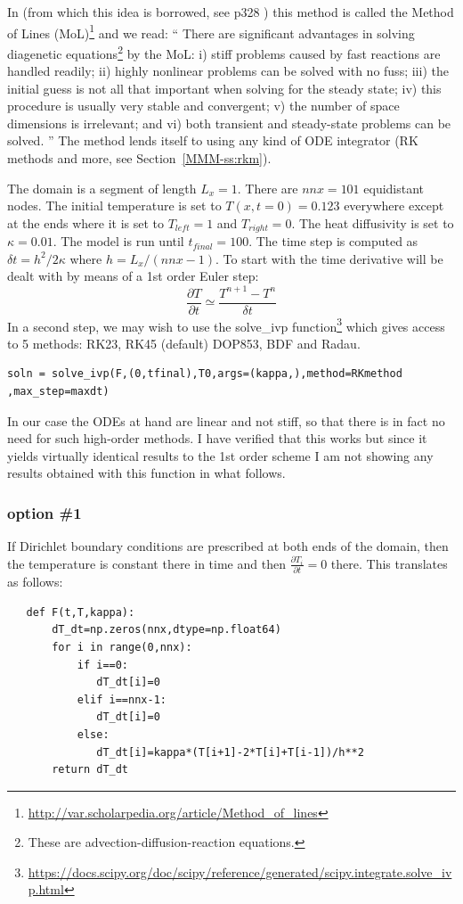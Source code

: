 In \textcite{boudreau} (from which this idea is borrowed, see p328 )
this method is called the Method of Lines (MoL)\footnote{\url{http://var.scholarpedia.org/article/Method_of_lines}} and we read:
``
There are significant advantages in solving diagenetic equations\footnote{These
are advection-diffusion-reaction equations.} by the MoL: 
i) stiff problems caused by fast reactions are handled readily; 
ii) highly nonlinear problems can be solved with no fuss; 
iii) the initial guess is not all that important when solving for the steady state; 
iv) this procedure is usually very stable and convergent; 
v) the number of space dimensions is irrelevant; and 
vi) both transient and steady-state problems can be solved.
''
The method lends itself to using any kind of ODE integrator (RK methods and more, 
see Section~\ref{MMM-ss:rkm}).

The domain is a segment of length $L_x=1$. There are $nnx=101$ equidistant nodes. 
The initial temperature is set to $T(x,t=0)=0.123$ everywhere 
except at the ends where it is set to $T_{left}=1$ and $T_{right}=0$.
The heat diffusivity is set to $\kappa=0.01$. The model is run until $t_{final}=100$.
The time step is computed as $\delta t=h^2/2\kappa$ where $h=L_x/(nnx-1)$.
To start with the time derivative will be dealt with by means of a 1st order
Euler step:
\[
\frac{\partial T}{\partial t} \simeq \frac{T^{n+1}-T^n}{\delta t}
\]
In a second step, we may wish to use the {\python solve\_ivp} 
function\footnote{\url{https://docs.scipy.org/doc/scipy/reference/generated/scipy.integrate.solve_ivp.html}}
which gives access to 5 methods: RK23, RK45 (default) DOP853, BDF and Radau.

\begin{lstlisting}
soln = solve_ivp(F,(0,tfinal),T0,args=(kappa,),method=RKmethod ,max_step=maxdt)
\end{lstlisting}

In our case the ODEs at hand are linear and not stiff, so that 
there is in fact no need for such high-order methods.
I have verified that this works but since it yields virtually identical 
results to the 1st order scheme I am not showing any results obtained with this function in what follows.

\subsubsection*{option \#1}

If Dirichlet boundary conditions are prescribed at both ends of the domain, 
then the temperature is constant there in time and then $\frac{\partial T_i}{\partial t}=0$ there.
This translates as follows:
\begin{lstlisting}
   def F(t,T,kappa):
       dT_dt=np.zeros(nnx,dtype=np.float64)
       for i in range(0,nnx):
           if i==0:
              dT_dt[i]=0
           elif i==nnx-1: 
              dT_dt[i]=0
           else:
              dT_dt[i]=kappa*(T[i+1]-2*T[i]+T[i-1])/h**2
       return dT_dt
\end{lstlisting}

